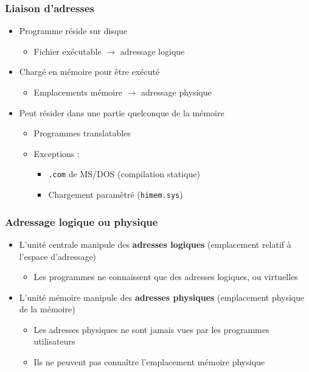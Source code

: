 \begin{frame}
\frametitle{Liaison d’adresses}
\begin{itemize}
\item Programme réside sur disque
\begin{itemize}
\item Fichier exécutable $\rightarrow$ adressage logique
\end{itemize}
\item Chargé en mémoire pour être exécuté
\begin{itemize}
\item Emplacements mémoire $\rightarrow$ adressage physique
\end{itemize}
\item Peut résider dans une partie quelconque de la mémoire
\begin{itemize}
\item Programmes translatables
\item Exceptions :
\begin{itemize}
\item \texttt{.com} de MS/DOS (compilation statique)
\item Chargement paramètré (\texttt{himem.sys})
\end{itemize}
\end{itemize}
\end{itemize}
\end{frame}

\begin{frame}
\frametitle{Adressage logique ou physique}
\begin{itemize}
\item <1>L’unité centrale manipule des \textbf{adresses logiques} (emplacement relatif à l'espace d'adressage)
\begin{itemize}
\item Les programmes ne connaissent que des adresses logiques, ou virtuelles
\end{itemize}
\item <2>L’unité mémoire manipule des \textbf{adresses physiques} (emplacement physique de la mémoire)
\begin{itemize}
\item Les adresses physiques ne sont jamais vues par les programmes utilisateurs
\item Ils ne peuvent pas connaître l'emplacement mémoire physique
\end{itemize}
\end{itemize}
\end{frame}


